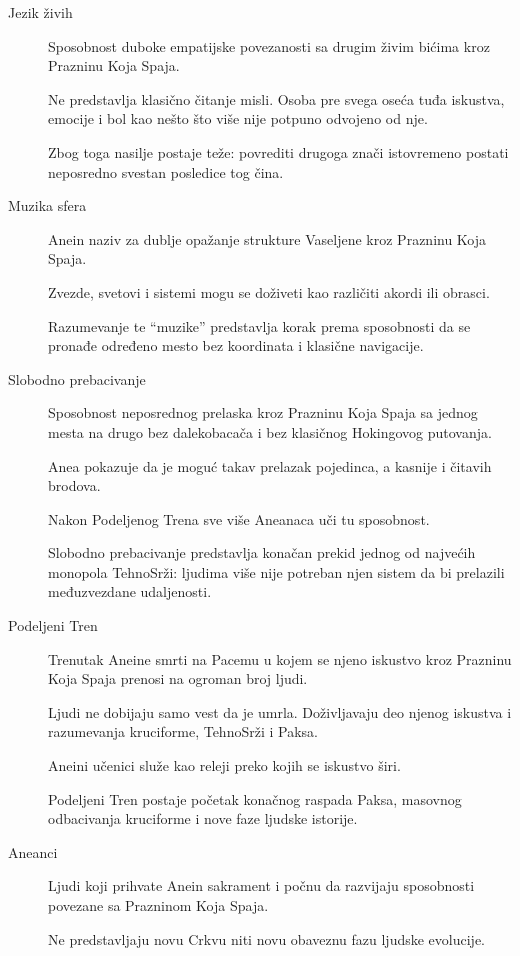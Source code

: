 \begin{description}
  \item[Jezik živih]
  Sposobnost duboke empatijske povezanosti sa drugim živim bićima kroz Prazninu Koja Spaja.

  Ne predstavlja klasično čitanje misli. Osoba pre svega oseća tuđa iskustva, emocije i bol kao nešto što više nije potpuno odvojeno od nje.

  Zbog toga nasilje postaje teže: povrediti drugoga znači istovremeno postati neposredno svestan posledice tog čina.


  \item[Muzika sfera]
  Anein naziv za dublje opažanje strukture Vaseljene kroz Prazninu Koja Spaja.

  Zvezde, svetovi i sistemi mogu se doživeti kao različiti akordi ili obrasci.

  Razumevanje te ``muzike'' predstavlja korak prema sposobnosti da se pronađe određeno mesto bez koordinata i klasične navigacije.


  \item[Slobodno prebacivanje]
  Sposobnost neposrednog prelaska kroz Prazninu Koja Spaja sa jednog mesta na drugo bez dalekobacača i bez klasičnog Hokingovog putovanja.

  Anea pokazuje da je moguć takav prelazak pojedinca, a kasnije i čitavih brodova.

  Nakon Podeljenog Trena sve više Aneanaca uči tu sposobnost.

  Slobodno prebacivanje predstavlja konačan prekid jednog od najvećih monopola TehnoSrži: ljudima više nije potreban njen sistem da bi prelazili međuzvezdane udaljenosti.


  \item[Podeljeni Tren]
  Trenutak Aneine smrti na Pacemu u kojem se njeno iskustvo kroz Prazninu Koja Spaja prenosi na ogroman broj ljudi.

  Ljudi ne dobijaju samo vest da je umrla. Doživljavaju deo njenog iskustva i razumevanja kruciforme, TehnoSrži i Paksa.

  Aneini učenici služe kao releji preko kojih se iskustvo širi.

  Podeljeni Tren postaje početak konačnog raspada Paksa, masovnog odbacivanja kruciforme i nove faze ljudske istorije.


  \item[Aneanci]
  Ljudi koji prihvate Anein sakrament i počnu da razvijaju sposobnosti povezane sa Prazninom Koja Spaja.

  Ne predstavljaju novu Crkvu niti novu obaveznu fazu ljudske evolucije.


\end{description}
